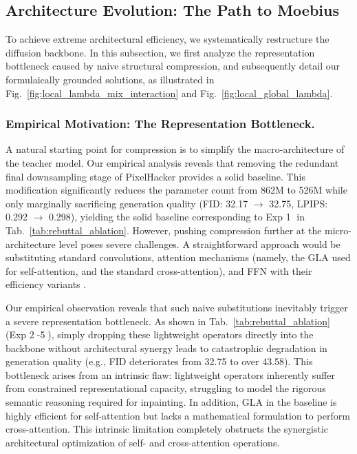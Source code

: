 \documentclass{llmxive}
\begin{document}
\vspace{-0.5em}
\subsection{Architecture Evolution: The Path to Moebius}\label{sec:architecture_evolution}
\vspace{-0.5em}
To achieve extreme architectural efficiency, we systematically restructure the diffusion backbone. In this subsection, we first analyze the representation bottleneck caused by naive structural compression, and subsequently detail our formulaically grounded solutions, as illustrated in Fig.~\ref{fig:local_lambda_mix_interaction} and Fig.~\ref{fig:local_global_lambda}.
\vspace{-0.7em}

\vspace{-1.5em}
\subsubsection{Empirical Motivation: The Representation Bottleneck.}\label{sec:motivation}
A natural starting point for compression is to simplify the macro-architecture of the teacher model. Our empirical analysis reveals that removing the redundant final downsampling stage of PixelHacker provides a solid baseline. This modification significantly reduces the parameter count from 862M to 526M while only marginally sacrificing generation quality (FID: 32.17 $\rightarrow$ 32.75, LPIPS: 0.292 $\rightarrow$ 0.298), yielding the solid baseline corresponding to Exp \textcircled{\small 1} in Tab.~\ref{tab:rebuttal_ablation}. However, pushing compression further at the micro-architecture level poses severe challenges. A straightforward approach would be substituting standard convolutions, attention mechanisms (namely, the GLA \cite{yang2024gla} used for self-attention, and the standard cross-attention), and FFN with their efficiency variants \cite{Sandler2018MobileNetV2, xie2024sana, xie2021segformer}.

Our empirical observation reveals that such naive substitutions inevitably trigger a severe representation bottleneck. As shown in Tab.~\ref{tab:rebuttal_ablation} (Exp \textcircled{\small 2}-\textcircled{\small 5}), simply dropping these lightweight operators directly into the backbone without architectural synergy leads to catastrophic degradation in generation quality (e.g., FID deteriorates from 32.75 to over 43.58). This bottleneck arises from an intrinsic flaw: lightweight operators inherently suffer from constrained representational capacity, struggling to model the rigorous semantic reasoning required for inpainting. In addition, GLA \cite{yang2024gla} in the baseline is highly efficient for self-attention but lacks a mathematical formulation to perform cross-attention. This intrinsic limitation completely obstructs the synergistic architectural optimization of self- and cross-attention operations.
\end{document}
